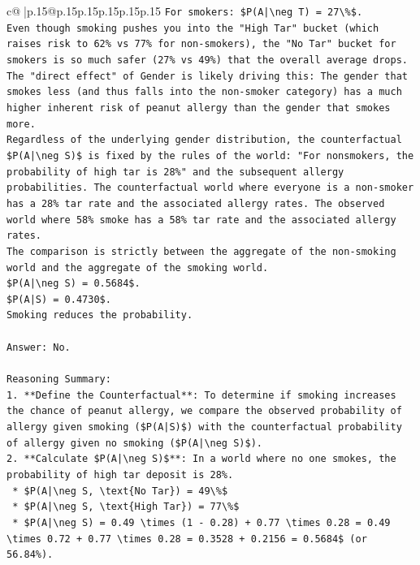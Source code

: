 \documentclass{article}
\begin{document}
{\begin{supertabular}{c@{$\;$}|p{.15\linewidth}@{}p{.15\linewidth}p{.15\linewidth}p{.15\linewidth}p{.15\linewidth}p{.15\linewidth}}
{{{\texttt{For smokers: \$P(A|\textbackslash{}neg T) = 27\textbackslash{}\%\$.} \\
\texttt{Even though smoking pushes you into the "High Tar" bucket (which raises risk to 62\% vs 77\% for non{-}smokers), the "No Tar" bucket for smokers is so much safer (27\% vs 49\%) that the overall average drops.} \\
\texttt{The "direct effect" of Gender is likely driving this: The gender that smokes less (and thus falls into the non{-}smoker category) has a much higher inherent risk of peanut allergy than the gender that smokes more.} \\
\texttt{Regardless of the underlying gender distribution, the counterfactual \$P(A|\textbackslash{}neg S)\$ is fixed by the rules of the world: "For nonsmokers, the probability of high tar is 28\%" and the subsequent allergy probabilities. The counterfactual world where everyone is a non{-}smoker has a 28\% tar rate and the associated allergy rates. The observed world where 58\% smoke has a 58\% tar rate and the associated allergy rates.} \\
\texttt{The comparison is strictly between the aggregate of the non{-}smoking world and the aggregate of the smoking world.} \\
\texttt{\$P(A|\textbackslash{}neg S) = 0.5684\$.} \\
\texttt{\$P(A|S) = 0.4730\$.} \\
\texttt{Smoking reduces the probability.} \\
\\ 
\texttt{Answer: No.} \\
\\ 
\texttt{Reasoning Summary:} \\
\texttt{1.  **Define the Counterfactual**: To determine if smoking increases the chance of peanut allergy, we compare the observed probability of allergy given smoking (\$P(A|S)\$) with the counterfactual probability of allergy given no smoking (\$P(A|\textbackslash{}neg S)\$).} \\
\texttt{2.  **Calculate \$P(A|\textbackslash{}neg S)\$**: In a world where no one smokes, the probability of high tar deposit is 28\%.} \\
\texttt{    *   \$P(A|\textbackslash{}neg S, \textbackslash{}text\{No Tar\}) = 49\textbackslash{}\%\$} \\
\texttt{    *   \$P(A|\textbackslash{}neg S, \textbackslash{}text\{High Tar\}) = 77\textbackslash{}\%\$} \\
\texttt{    *   \$P(A|\textbackslash{}neg S) = 0.49 \textbackslash{}times (1 {-} 0.28) + 0.77 \textbackslash{}times 0.28 = 0.49 \textbackslash{}times 0.72 + 0.77 \textbackslash{}times 0.28 = 0.3528 + 0.2156 = 0.5684\$ (or 56.84\%).} \\
}}}
\end{supertabular}}
\end{document}
